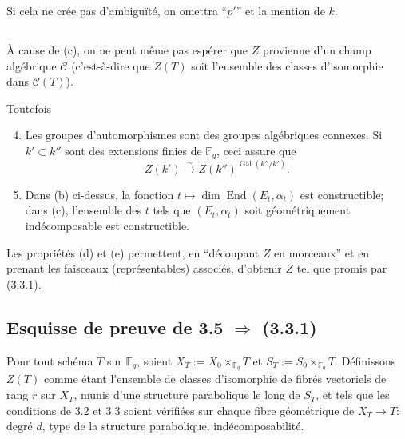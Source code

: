 \documentclass[11pt,a4paper]{article}
\theoremstyle{plain}
\theoremstyle{definition}
\DeclareMathOperator{\Gal}{Gal}
\DeclareMathOperator{\End}{End}
\newcommand{\F}{\mathbb{F}}
\begin{document}
Si cela ne cr\'ee pas d'ambigu\"it\'e, on omettra ``$p'$'' et la mention de $k$.

\subsection{}
\`A cause de (c), on ne peut m\^eme pas esp\'erer que $Z$ provienne d'un champ alg\'ebrique $\mathcal{C}$ (c'est-\`a-dire que $Z(T)$ soit l'ensemble des classes d'isomorphie dans $\mathcal{C}(T)$).

Toutefois
\begin{enumerate}[label=(\alph*)]
\setcounter{enumi}{3}
\item Les groupes d'automorphismes sont des groupes alg\'ebriques connexes. Si $k' \subset k''$ sont des extensions finies de $\F_q$, ceci assure que
\[
Z(k') \xrightarrow{\sim} Z(k'')^{\Gal(k''/k')}.
\]
\item Dans (b) ci-dessus, la fonction $t \mapsto \dim \End(E_t, \alpha_t)$ est constructible; dans (c), l'ensemble des $t$ tels que $(E_t, \alpha_t)$ soit g\'eom\'etriquement ind\'ecomposable est constructible.
\end{enumerate}

Les propri\'et\'es (d) et (e) permettent, en ``d\'ecoupant $Z$ en morceaux'' et en prenant les faisceaux (repr\'esentables) associ\'es, d'obtenir $Z$ tel que promis par (3.3.1).

\subsection{Esquisse de preuve de 3.5 $\Rightarrow$ (3.3.1)}
Pour tout sch\'ema $T$ sur $\F_q$, soient $X_T := X_0 \times_{\F_q} T$ et $S_T := S_0 \times_{\F_q} T$. D\'efinissons $Z(T)$ comme \'etant l'ensemble de classes d'isomorphie de fibr\'es vectoriels de rang $r$ sur $X_T$, munis d'une structure parabolique le long de $S_T$, et tels que les conditions de 3.2 et 3.3 soient v\'erifi\'ees sur chaque fibre g\'eom\'etrique de $X_T \to T$: degr\'e $d$, type de la structure parabolique, ind\'ecomposabilit\'e.
\end{document}
